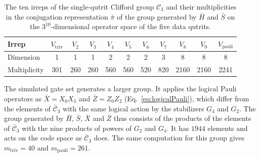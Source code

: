 \begin{table}[tp]
  \centering
  \begin{tabular}{l|cccccccccc}
    \hline
    Irrep & $V_{\mathrm{triv}}$ & $V_2$ & $V_3$ & $V_4$ & $V_5$ & $V_6$ & $V_7$ & $V_8$ & $V_9$ & $V_{\mathrm{pauli}}$ \\
    \hline
    Dimension & 1 & 1 & 1 & 2 & 2 & 2 & 3 & 8 & 8 & 8 \\
    Multiplicity & 301 & 260 & 260 & 560 & 560 & 520 & 820 & 2160 & 2160 & 2241 \\
    \hline
  \end{tabular}
  \caption{The ten irreps of the single-qutrit Clifford group $\mathcal{C}_3$ and their multiplicities in the conjugation representation $\bar\pi$ of the group generated by $\bar H$ and $\bar S$ on the $3^{10}$-dimensional operator space of the five data qutrits.}
  \label{tab:irreps}
\end{table}

The simulated gate set generates a larger group. It applies the logical Pauli operators as $\bar X = X_0 X_3$ and $\bar Z = Z_0 Z_2$ (Eq.~\eqref{eq:logicalPauli}), which differ from the elements of $\bar{\mathcal{C}}_3$ with the same logical action by the stabilizers $G_4$ and $G_2$. The group generated by $\bar H$, $\bar S$, $\bar X$ and $\bar Z$ thus consists of the products of the elements of $\bar{\mathcal{C}}_3$ with the nine products of powers of $G_2$ and $G_4$. It has $1944$ elements and acts on the code space as $\bar{\mathcal{C}}_3$ does. The same computation for this group gives $m_{\mathrm{triv}} = 40$ and $m_{\mathrm{pauli}} = 261$.

